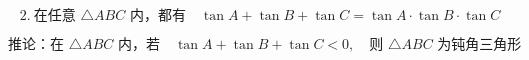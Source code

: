 \[
2.\ \text{在任意 } \triangle ABC \text{ 内，都有}
\quad
\tan A+\tan B+\tan C
=
\tan A\cdot\tan B\cdot\tan C
\]

\[
\text{推论：在 } \triangle ABC \text{ 内，若}
\quad
\tan A+\tan B+\tan C<0,
\quad
\text{则 } \triangle ABC \text{ 为钝角三角形}
\]